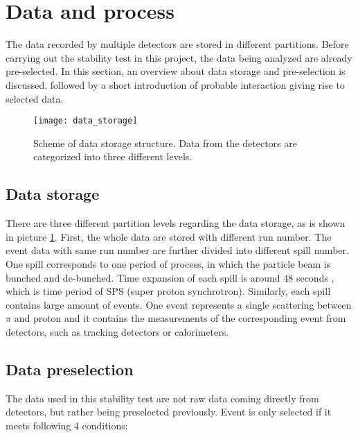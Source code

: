 

\section{Data and process}
The data recorded by multiple detectors are stored in different partitions. Before carrying out the stability test in this project, the data being analyzed are already pre-selected. In this section, an overview about data storage and pre-selection is discussed, followed by a short introduction of probable interaction giving rise to selected data.

\begin{figure}[t!]
	\centering
	\texttt{[image: data\_storage]}
	\caption{Scheme of data storage structure. Data from the detectors are categorized into three different levels.}
	\label{fig:data_storage}
\end{figure}

\subsection{Data storage}
There are three different partition levels regarding the data storage, as is shown in picture \ref{fig:data_storage}. First, the whole data are stored with different run number. The event data with same run number are further divided into different spill number. One spill corresponds to one period of process, in which the particle beam is bunched and de-bunched. Time expansion of each spill is around 48 seconds \cite{COMPASS}, which is time period of SPS (super proton synchrotron). Similarly, each spill contains large amount of events. One event represents a single scattering between $\pi$ and proton and it contains the measurements of the corresponding event from detectors, such as tracking detectors or calorimeters.
\subsection{Data preselection}
The data used in this stability test are not raw data coming directly from detectors, but rather being preselected previously. Event is only selected if it meets following 4 conditions: 

